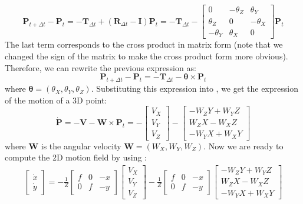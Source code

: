 \begin{equation}
\mathbf{P}_{t+\Delta t} - \mathbf{P}_{t} = - \mathbf{T}_{\Delta t} + (\mathbf{R}_{\Delta t} - \mathbf{I}) \mathbf{P}_t = 
- \mathbf{T}_{\Delta t} - 
\begin{bmatrix}
0 &  -\theta_Z & \theta_Y\\
\theta_Z & 0 &  -\theta_X \\
-\theta_Y &  \theta_X &  0 
\end{bmatrix}
\mathbf{P}_t
\end{equation}
The last term corresponds to the cross product in matrix form (note that we changed the sign of the matrix to make the cross product form more obvious). Therefore, we can rewrite the previous expression as:
\begin{equation}
\mathbf{P}_{t+\Delta t} - \mathbf{P}_{t} = 
- \mathbf{T}_{\Delta t} - \bm{\theta} \times \mathbf{P}_t
\end{equation}
where $\bm{\theta}=(\theta_X,\theta_Y, \theta_Z)$. Substituting this expression into \eqn{\ref{eq:general_camera_motion_equation_full}}, we get the expression of the motion of a 3D point:
\begin{equation}
\dot{\mathbf{P}} = - \mathbf{V} - \mathbf{W} \times \mathbf{P}_t =
-\begin{bmatrix}
V_X\\
V_Y \\
V_Z 
\end{bmatrix}
-
\begin{bmatrix}
-W_Z Y + W_Y Z\\
W_Z X - W_X Z \\
-W_Y X + W_X Y 
\end{bmatrix}
\end{equation}
where $\mathbf{W}$ is the angular velocity $\mathbf{W}=(W_X,W_Y,W_Z)$. Now we are ready to compute the 2D motion field by using \eqn{\ref{eq:motionprojection}}: 
\begin{align}
\begin{bmatrix}
\dot{x} \\
\dot{y}
\end{bmatrix}
= -\frac{1}{Z}
\begin{bmatrix}
f & 0 & -x \\
0 & f & -y  
\end{bmatrix}
\begin{bmatrix}
V_X\\
V_Y \\
V_Z 
\end{bmatrix}
-\frac{1}{Z}
\begin{bmatrix}
f & 0 & -x \\
0 & f & -y  
\end{bmatrix}
\begin{bmatrix}
-W_Z Y + W_Y Z\\
W_Z X - W_X Z \\
-W_Y X + W_X Y 
\end{bmatrix}
\end{align}

